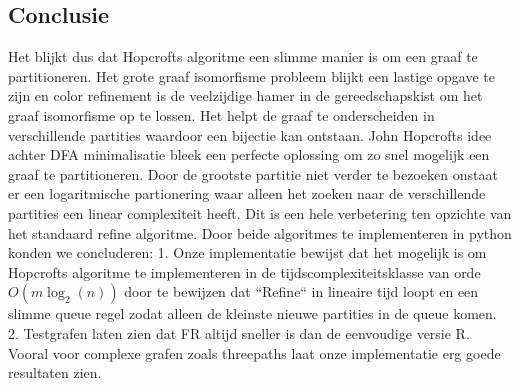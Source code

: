 \documentclass[twoside]{article}
\begin{document}
\begin{multicols}{2}
\section{Conclusie}
Het blijkt dus dat Hopcrofts algoritme een slimme manier is om een graaf te partitioneren. Het grote graaf isomorfisme probleem blijkt een lastige opgave te zijn en color refinement is de veelzijdige hamer in de gereedschapskist om het graaf isomorfisme op te lossen. Het helpt de graaf te onderscheiden in verschillende partities waardoor een bijectie kan ontstaan. John Hopcrofts idee achter DFA minimalisatie bleek een perfecte oplossing om zo snel mogelijk een graaf te partitioneren. Door de grootste partitie niet verder te bezoeken onstaat er een logaritmische partionering waar alleen het zoeken naar de verschillende partities een linear complexiteit heeft. Dit is een hele verbetering ten opzichte van het standaard refine algoritme. Door beide algoritmes te implementeren in python konden we concluderen: 1. Onze implementatie bewijst dat het mogelijk is om Hopcrofts algoritme te implementeren in de tijdscomplexiteitsklasse van orde $O(m\log_{2}(n))$ door te bewijzen dat ``Refine`` in lineaire tijd loopt en een slimme queue regel zodat alleen de kleinste nieuwe partities in de queue komen. 2. Testgrafen laten zien dat FR altijd sneller is dan de eenvoudige versie R. Vooral voor complexe grafen zoals threepaths laat onze implementatie erg goede resultaten zien.


\end{multicols}
\end{document}
